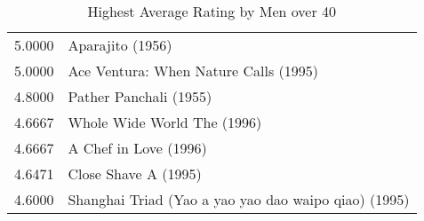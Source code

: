 \begin{flushleft}
\begin{table}[h]
\begin{tabular}{ll}
5.0000 & Aparajito (1956)                                      \\
5.0000 & Ace Ventura: When Nature Calls (1995)                 \\ \hline
4.8000 & Pather Panchali (1955)                                \\ \hline
4.6667 & Whole Wide World The (1996)                           \\
4.6667 & A Chef in Love (1996)                                 \\ \hline
4.6471 & Close Shave A (1995)                                  \\ \hline
4.6000 & Shanghai Triad (Yao a yao yao dao waipo qiao) (1995) 
\end{tabular}
\caption{Highest Average Rating by Men over 40}
\end{table}


\end{flushleft}
